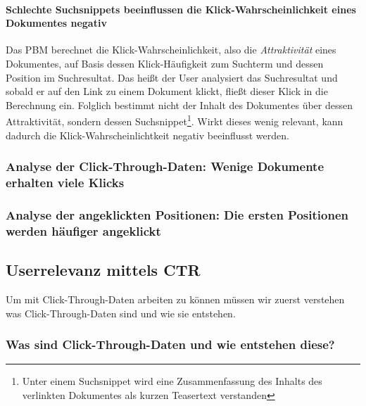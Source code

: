 \paragraph{Schlechte Suchsnippets beeinflussen die Klick-Wahrscheinlichkeit eines Dokumentes negativ}
Das PBM berechnet die Klick-Wahrscheinlichkeit, also die \textit{Attraktivität} eines Dokumentes, auf Basis dessen Klick-Häufigkeit zum Suchterm und dessen Position im Suchresultat. Das heißt der User analysiert das Suchresultat und sobald er auf den Link zu einem Dokument klickt, fließt dieser Klick in die Berechnung ein. Folglich bestimmt nicht der Inhalt des Dokumentes über dessen Attraktivität, sondern dessen Suchsnippet\footnote{Unter einem Suchsnippet wird eine Zusammenfassung des Inhalts des verlinkten Dokumentes als kurzen Teasertext verstanden}. Wirkt dieses wenig relevant, kann dadurch die Klick-Wahrscheinlichtkeit negativ beeinflusst werden.

\pagebreak

\subsubsection{Analyse der Click-Through-Daten: Wenige Dokumente erhalten viele Klicks}
\label{sec:Grundlagen:Grundbegriffe:SemantikUserInteraktionen:DocumentAttraction}



\subsubsection{Analyse der angeklickten Positionen: Die ersten Positionen werden häufiger angeklickt}
\label{sec:Grundlagen:Grundbegriffe:SemantikUserInteraktionen:RankExamination}




\subsection{Userrelevanz mittels CTR}
\label{sec:Grundlagen:Grundbegriffe:Click-Through-Daten}

Um mit Click-Through-Daten arbeiten zu können müssen wir zuerst verstehen was Click-Through-Daten sind und wie sie entstehen. 

\subsubsection{Was sind Click-Through-Daten und wie entstehen diese?}
\label{sec:Grundlagen:Grundbegriffe:Click-Through-Daten:WasSindClick-Through-Daten}

